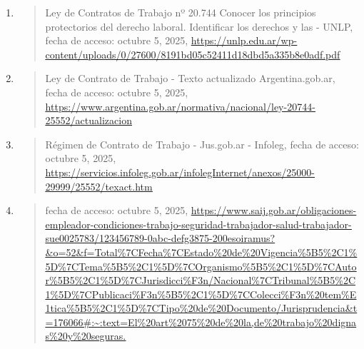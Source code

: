 \documentclass[]{article}
\begin{document}
\begin{enumerate}
\begin{quote}
  \end{quote}
\item
  \begin{quote}
  Ley de Contratos de Trabajo nº 20.744 Conocer los principios
  protectorios del derecho laboral. Identificar los derechos y las -
  UNLP, fecha de acceso: octubre 5, 2025,
  \href{https://unlp.edu.ar/wp-content/uploads/0/27600/8191bd05c52411d18dbd5a335b8e0adf.pdf}{\uline{https://unlp.edu.ar/wp-content/uploads/0/27600/8191bd05c52411d18dbd5a335b8e0adf.pdf}}
  \end{quote}
\item
  \begin{quote}
  Ley de Contrato de Trabajo - Texto actualizado \textbar{}
  Argentina.gob.ar, fecha de acceso: octubre 5, 2025,
  \href{https://www.argentina.gob.ar/normativa/nacional/ley-20744-25552/actualizacion}{\uline{https://www.argentina.gob.ar/normativa/nacional/ley-20744-25552/actualizacion}}
  \end{quote}
\item
  \begin{quote}
  Régimen de Contrato de Trabajo - Jus.gob.ar - Infoleg, fecha de
  acceso: octubre 5, 2025,
  \href{https://servicios.infoleg.gob.ar/infolegInternet/anexos/25000-29999/25552/texact.htm}{\uline{https://servicios.infoleg.gob.ar/infolegInternet/anexos/25000-29999/25552/texact.htm}}
  \end{quote}
\item
  \begin{quote}
  fecha de acceso: octubre 5, 2025,
  \href{https://www.saij.gob.ar/obligaciones-empleador-condiciones-trabajo-seguridad-trabajador-salud-trabajador-sue0025783/123456789-0abc-defg3875-200esoiramus?\&o=52\&f=Total\%7CFecha\%7CEstado+de+Vigencia\%5B5,1\%5D\%7CTema\%5B5,1\%5D\%7COrganismo\%5B5,1\%5D\%7CAutor\%5B5,1\%5D\%7CJurisdicci\%EF\%BF\%BDn/Nacional\%7CTribunal\%5B5,1\%5D\%7CPublicaci\%EF\%BF\%BDn\%5B5,1\%5D\%7CColecci\%EF\%BF\%BDn+tem\%EF\%BF\%BDtica\%5B5,1\%5D\%7CTipo+de+Documento/Jurisprudencia\&t=176066\#:~:text=El\%20art\%2075\%20de\%20la,de\%20trabajo\%20dignas\%20y\%20seguras.}{\uline{https://www.saij.gob.ar/obligaciones-empleador-condiciones-trabajo-seguridad-trabajador-salud-trabajador-sue0025783/123456789-0abc-defg3875-200esoiramus?\&o=52\&f=Total\%7CFecha\%7CEstado\%20de\%20Vigencia\%5B5\%2C1\%5D\%7CTema\%5B5\%2C1\%5D\%7COrganismo\%5B5\%2C1\%5D\%7CAutor\%5B5\%2C1\%5D\%7CJurisdicci\%F3n/Nacional\%7CTribunal\%5B5\%2C1\%5D\%7CPublicaci\%F3n\%5B5\%2C1\%5D\%7CColecci\%F3n\%20tem\%E1tica\%5B5\%2C1\%5D\%7CTipo\%20de\%20Documento/Jurisprudencia\&t=176066\#:\textasciitilde:text=El\%20art\%2075\%20de\%20la,de\%20trabajo\%20dignas\%20y\%20seguras.}}

\end{quote}
\end{enumerate}
\end{document}
